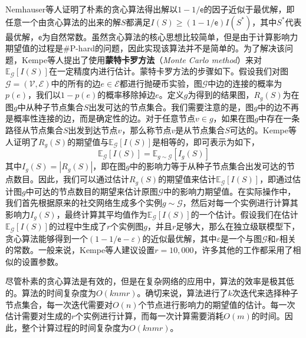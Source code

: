 Nemhauser等人证明了朴素的贪心算法得出解以$1-1/\mathsf{e}$的因子近似于最优解，即任意一个由贪心算法的出来的解$S$都满足$I\left(S\right) \geq (1-1/\mathsf{e}) I\left(S^{\ast}\right)$，其中$S^{\ast}$代表最优解，$\mathsf{e}$为自然常数。虽然贪心算法的核心思想比较简单，但是由于计算影响力期望值的过程是\#P-hard的问题，因此实现该算法并不是简单的。为了解决该问题，Kempe等人提出了使用\textbf{蒙特卡罗方法}（\textit{Monte Carlo method}）来对$\mathbb{E}_\mathcal{G}\left[I\left(S\right)\right]$在一定精度内进行估计。蒙特卡罗方法的步骤如下。假设我们对图$\mathcal{G}=\left(\mathcal{V},\mathcal{E}\right)$中的所有的边$e\in\mathcal{E}$都进行抛硬币实验，图$\mathcal{G}$中边的连接的概率为$p\left(e\right)$，我们以$1-p\left(e\right)$的概率移除掉边$e$。定义$g$为得到的结果图，$R_g\left(S\right)$为在图$g$中从种子节点集合$S$出发可达的节点集合。我们需要注意的是，图$g$中的边不再是概率性连接的边，而是确定性的边。对于任意节点$v\in g$，如果在图$g$中存在一条路径从节点集合$S$出发到达节点$v$，那么称节点$v$是从节点集合$S$可达的。Kempe等人证明了$R_g\left(S\right)$的期望值与$\mathbb{E}_\mathcal{G}\left[I\left(S\right)\right]$是相等的，即可表示为如下，
\begin{equation}
\label{eq:influenceSpread}
    \mathbb{E}_\mathcal{G}\left[I\left(S\right)\right] = \mathbb{E}_{g\sim\mathcal{G}}\left[I_g\left(S\right)\right]
\end{equation}
其中$I_g\left(S\right) = \left\vert{R_g\left(S\right)}\right\vert$，即在图$g$中的影响力等于从种子节点集合出发可达的节点数目。因此，我们可以通过估计$R_g\left(S\right)$的期望值来估计$\mathbb{E}_\mathcal{G}\left[I\left(S\right)\right]$，即通过估计图$g$中可达的节点数目的期望来估计原图$\mathcal{G}$中的影响力期望值。在实际操作中，我们首先根据原来的社交网络生成多个实例$g\sim\mathcal{G}$，然后对每一个实例进行计算其影响力$I_g\left(S\right)$，最终计算其平均值作为$\mathbb{E}_\mathcal{G}\left[I\left(S\right)\right]$的一个估计。假设我们在估计$\mathbb{E}_\mathcal{G}\left[I\left(S\right)\right]$的过程中生成了$r$个实例图$g$，并且$r$足够大，那么在独立级联模型下，贪心算法能够得到一个$\left(1-1/\mathsf{e}-\varepsilon\right)$的近似最优解，其中$\varepsilon$是一个与图$\mathcal{G}$和$r$相关的常数。一般来说，Kempe等人建议设置$r=10,000$，许多其他的工作都采用了相似的设置参数。

尽管朴素的贪心算法是有效的，但是在复杂网络的应用中，算法的效率是极其低的。算法的时间复杂度为$O\left(knmr\right)$。确切来说，算法进行了$k$次迭代来选择种子节点集合，每一次迭代需要对$O\left(n\right)$个节点进行影响力的期望值的估计。每一次估计需要对生成的$r$个实例进行计算，而每一次计算需要消耗$O\left(m\right)$的时间。因此，整个计算过程的时间复杂度为$O\left(knmr\right)$。

